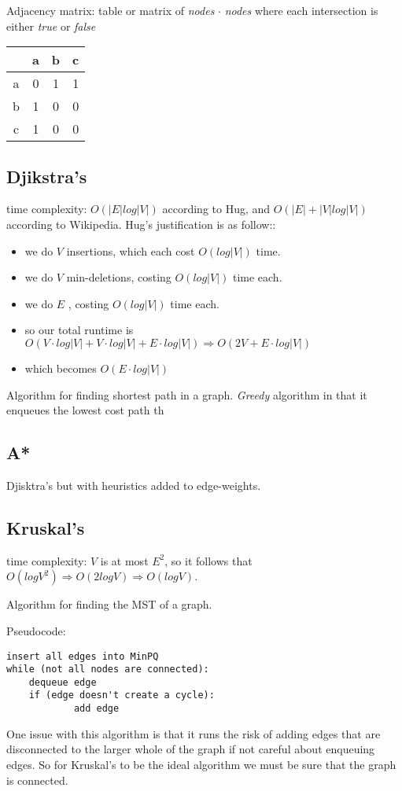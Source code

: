 \documentclass[12pt, letterpaper]{article}
\begin{document}
Adjacency matrix: table or matrix of \emph{nodes} $\cdot$ \emph{nodes} where each intersection is either \emph{true} or \emph{false}

\begin{center}
\begin{tabular}{c | c c c}
 & a & b & c \\ \hline
 a & 0 & 1 & 1 \\
 b & 1 & 0 & 0 \\
 c & 1 & 0 & 0 \\
\end{tabular}
\end{center}

\subsection{Djikstra's}
time complexity: $O(|E|log|V|)$ according to Hug, and $O(|E| + |V|log|V|)$ according to Wikipedia. Hug's justification is as follow::
\begin{itemize}
\item we do $V$ insertions, which each cost $O(log|V|)$ time.
\item we do $V$ min-deletions, costing $O(log|V|)$ time each.
\item we do $E$ , costing $O(log|V|)$ time each.
\item so our total runtime is $O(V\cdot log|V| + V\cdot log|V| + E\cdot log|V|) \Rightarrow O(2V+E\cdot log|V|)$
\item which becomes $O(E\cdot log|V|)$
\end{itemize}

Algorithm for finding shortest path in a graph. \textit{Greedy} algorithm in that it enqueues the lowest cost path th
\subsection{A*}
Djisktra's but with heuristics added to edge-weights.
\subsection{Kruskal's}
time complexity: $V$ is at most $E^2$, so it follows that 
$O(logV^2) \Rightarrow O(2logV) \Rightarrow O(logV)$.

Algorithm for finding the MST of a graph. 

Pseudocode: 
\begin{verbatim}
insert all edges into MinPQ
while (not all nodes are connected):
    dequeue edge
    if (edge doesn't create a cycle):
    	    add edge
\end{verbatim}
One issue with this algorithm is that it runs the risk of adding edges that are disconnected to the larger whole of the graph if not careful about enqueuing edges. So for Kruskal's to be the ideal algorithm we must be sure that the graph is connected.
\end{document}
